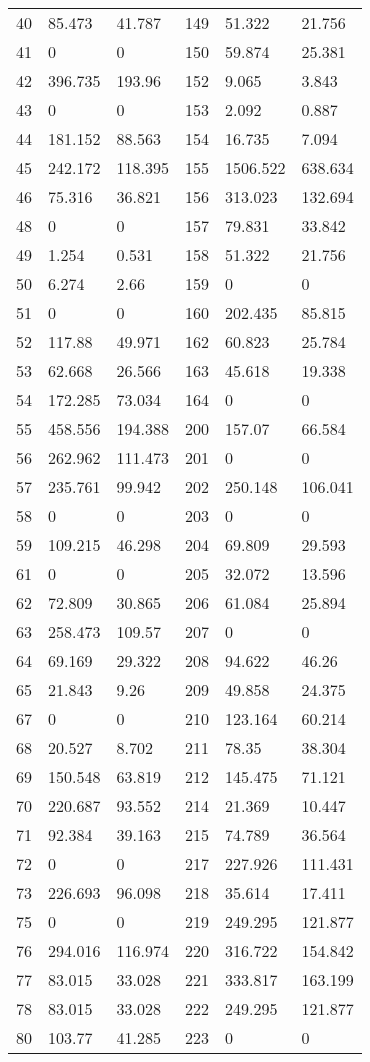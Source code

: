 \begin{tabular}{llllll}
40&85.473&41.787&149&51.322&21.756\\
41&0&0&150&59.874&25.381\\
42&396.735&193.96&152&9.065&3.843\\
43&0&0&153&2.092&0.887\\
44&181.152&88.563&154&16.735&7.094\\
45&242.172&118.395&155&1506.522&638.634\\
46&75.316&36.821&156&313.023&132.694\\
48&0&0&157&79.831&33.842\\
49&1.254&0.531&158&51.322&21.756\\
50&6.274&2.66&159&0&0\\
51&0&0&160&202.435&85.815\\
52&117.88&49.971&162&60.823&25.784\\
53&62.668&26.566&163&45.618&19.338\\
54&172.285&73.034&164&0&0\\
55&458.556&194.388&200&157.07&66.584\\
56&262.962&111.473&201&0&0\\
57&235.761&99.942&202&250.148&106.041\\
58&0&0&203&0&0\\
59&109.215&46.298&204&69.809&29.593\\
61&0&0&205&32.072&13.596\\
62&72.809&30.865&206&61.084&25.894\\
63&258.473&109.57&207&0&0\\
64&69.169&29.322&208&94.622&46.26\\
65&21.843&9.26&209&49.858&24.375\\
67&0&0&210&123.164&60.214\\
68&20.527&8.702&211&78.35&38.304\\
69&150.548&63.819&212&145.475&71.121\\
70&220.687&93.552&214&21.369&10.447\\
71&92.384&39.163&215&74.789&36.564\\
72&0&0&217&227.926&111.431\\
73&226.693&96.098&218&35.614&17.411\\
75&0&0&219&249.295&121.877\\
76&294.016&116.974&220&316.722&154.842\\
77&83.015&33.028&221&333.817&163.199\\
78&83.015&33.028&222&249.295&121.877\\
80&103.77&41.285&223&0&0\\
\bottomrule
\end{tabular}
